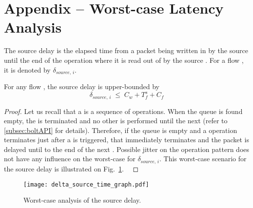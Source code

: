 
\section{Appendix -- Worst-case Latency Analysis}
\label{append:drp_WCanalysis}

\begin{definition}
The source delay is the elapsed time from
a packet being written in \bolt by the source \apsrc
until
the end of the \opflush operation where it is read out of \bolt by the source \cpsrc.
For a flow \flowi, it is denoted by $\delta_{source, \,i}$.
\end{definition}

\begin{lemma}\label{lem:delta_source}
For any flow \flowi, the source delay is upper-bounded by
\begin{equation}
\label{eq:delta_source}
\delta_{source, \,i} \; \leq \; C_w + T_f^s + C_f
\end{equation}
\end{lemma}

\begin{proof}%
Let us recall that a \opflush is a sequence of \opread operations. When the \bolt queue is found empty, the \opflush is terminated and no other \opread is performed until the next \opflush (refer to \ref{subsec:boltAPI} for details).
Therefore, if the \bolt queue is empty and a \opwrite operation terminates just after a \opflush is triggered, that \opflush immediately terminates and the packet is delayed until to the end of the next \opflush.
Possible jitter on the \opwrite operation pattern does not have any influence on the worst-case for $\delta_{source, \,i}$.
This worst-case scenario for the source delay is illustrated on Fig.~\ref{fig:delta_source_time_graph}. \
\end{proof}

\begin{figure}[h!]
\centering
\texttt{[image: delta\_source\_time\_graph.pdf]}
\caption{Worst-case analysis of the source delay.
}
\label{fig:delta_source_time_graph}
\end{figure}


